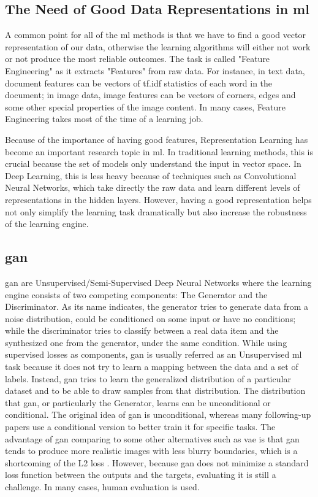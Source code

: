 \subsection{The Need of Good Data Representations in \acrshort{ml}}
A common point for all of the \acrshort{ml} methods is that we have to find a good vector
representation of our data, otherwise the learning algorithms will either not work or not
produce the most reliable outcomes. The task is called "Feature Engineering" as it
extracts "Features" from raw data. For instance, in text data, document features can be
vectors of tf.idf statistics of each word in the document; in image data, image features
can be vectors of corners, edges and some other special properties of the image content.
In many cases, Feature Engineering takes most of the time of a learning job.

Because of the importance of having good features, Representation Learning has become an
important research topic in \acrshort{ml}. In traditional learning methods, this is
crucial because the set of models only understand the input in vector space. In Deep
Learning, this is less heavy because of techniques such as Convolutional Neural Networks,
which take directly the raw data and learn different levels of representations in the
hidden layers. However, having a good representation helps not only simplify the learning
task dramatically but also increase the robustness of the learning engine.

\subsection{\acrfull{gan} \label{subsec:intro_gan}}
\acrlong{gan} \cite{gan} are Unsupervised/Semi-Supervised Deep Neural Networks where the
learning engine consists of two competing components: The Generator and the Discriminator.
As its name indicates, the generator tries to generate data from a noise distribution,
could be conditioned on some input or have no conditions; while the discriminator tries to
classify between a real data item and the synthesized one from the generator, under the
same condition. While using supervised losses as components, \acrshort{gan} is usually
referred as an Unsupervised \acrshort{ml} task because it does not try to learn a mapping
between the data and a set of labels. Instead, \acrshort{gan} tries to learn the
generalized distribution of a particular dataset and to be able to draw samples from that
distribution. The distribution that \acrshort{gan}, or particularly the Generator, learns
can be unconditional or conditional. The original idea of \acrshort{gan} is unconditional,
whereas many following-up papers use a conditional version to better train it for specific
tasks. The advantage of \acrshort{gan} comparing to some other alternatives such as
\acrfull{vae} \cite{vae} is that \acrshort{gan} tends to produce more realistic images
with less blurry boundaries, which is a shortcoming of the L2 loss \cite{gan}.  However,
because \acrshort{gan} does not minimize a standard loss function between the outputs and
the targets, evaluating it is still a challenge. In many cases, human evaluation is used.

